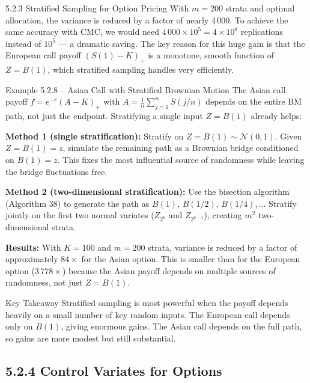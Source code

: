 \documentclass[aspectratio=169,10pt]{beamer}
\begin{document}
\begin{frame}[allowframebreaks]{5.2.3 Stratified Sampling for Option Pricing}
With $m = 200$ strata and optimal allocation, the variance is reduced by a
factor of nearly 4\,000.  To achieve the same accuracy with CMC, we would need
$4\,000 \times 10^5 = 4 \times 10^8$ replications instead of $10^5$ --- a
dramatic saving.  The key reason for this huge gain is that the European call
payoff $(S(1) - K)_+$ is a monotone, smooth function of $Z = B(1)$, which
stratified sampling handles very efficiently.

\framebreak

\begin{block}{Example 5.2.8 -- Asian Call with Stratified Brownian Motion}
  The Asian call payoff $f = e^{-r}(A - K)_+$ with
  $A = \frac{1}{n}\sum_{j=1}^n S(j/n)$ depends on the entire BM path, not just
  the endpoint.  Stratifying a single input $Z = B(1)$ already helps:

  \textbf{Method 1 (single stratification):} Stratify on $Z = B(1) \sim \mathcal{N}(0,1)$.
  Given $Z = B(1) = z$, simulate the remaining path as a Brownian bridge
  conditioned on $B(1) = z$.  This fixes the most influential source of
  randomness while leaving the bridge fluctuations free.

  \textbf{Method 2 (two-dimensional stratification):} Use the bisection algorithm
  (Algorithm 38) to generate the path as $B(1),\, B(1/2),\, B(1/4),\ldots$
  Stratify jointly on the first two normal variates ($Z_{2^k}$ and $Z_{2^{k-1}}$),
  creating $m^2$ two-dimensional strata.

  \textbf{Results:} With $K = 100$ and $m = 200$ strata, variance is reduced by
  a factor of approximately $84\times$ for the Asian option.  This is smaller than
  for the European option ($3\,778\times$) because the Asian payoff depends on
  multiple sources of randomness, not just $Z = B(1)$.
\end{block}

\begin{alertblock}{Key Takeaway}
  Stratified sampling is most powerful when the payoff depends heavily on a
  small number of key random inputs.  The European call depends only on $B(1)$,
  giving enormous gains.  The Asian call depends on the full path, so gains are
  more modest but still substantial.
\end{alertblock}

\end{frame}

\subsection{5.2.4 Control Variates for Options}
\end{document}
